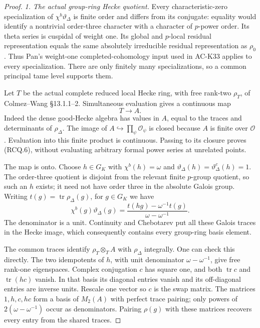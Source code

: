 \begin{proof}
\textit{1. The actual group-ring Hecke quotient.}
Every characteristic-zero specialization of
\(\chi^b\vartheta_\Delta\) is finite order and differs from its
conjugate: equality would identify a nontrivial order-three
character with a character of \(p\)-power order.
Its theta series is cuspidal of weight one.
Its global and \(p\)-local residual representation equals the same
absolutely irreducible residual representation as \(\rho_0\).
Thus Pan's weight-one completed-cohomology input used in AC-K33
applies to every specialization. There are only finitely many
specializations, so a common principal tame level supports them.

Let \(T\) be the actual complete reduced local Hecke ring, with
free rank-two \(\rho_T\), of Colmez--Wang \S13.1.1--2.
Simultaneous evaluation gives a continuous map
\[
                         T\longrightarrow A.
 \tag{RCQ.6}
\]
Indeed the dense good-Hecke algebra has values in \(A\), equal to
the traces and determinants of \(\rho_\Delta\).
The image of \(A\hookrightarrow\prod_\psi\mathcal O_\psi\) is closed
because \(A\) is finite over \(\mathcal O\). Evaluation into this
finite product is continuous. Passing to its closure proves (RCQ.6),
without evaluating arbitrary formal power series at unrelated points.

The map is onto. Choose \(h\in G_K\) with
\(\chi^b(h)=\omega\) and
\(\vartheta_\Delta(h)=\vartheta_\Delta^c(h)=1\).
The order-three quotient is disjoint from the relevant finite
\(p\)-group quotient, so such an \(h\) exists; it need not have
order three in the absolute Galois group.
Writing \(t(g)=\operatorname{tr}\rho_\Delta(g)\), for \(g\in G_K\) we have
\[
 \chi^b(g)\vartheta_\Delta(g)=
       \frac{t(hg)-\omega^{-1}t(g)}{\omega-\omega^{-1}}.
 \tag{RCQ.7}
\]
The denominator is a unit. Continuity and Chebotarev put all these
Galois traces in the Hecke image, which consequently contains every
group-ring basis element.

The common traces identify \(\rho_T\otimes_T A\) with
\(\rho_\Delta\) integrally. One can check this directly.
The two idempotents of \(h\), with unit denominator
\(\omega-\omega^{-1}\), give free rank-one eigenspaces.
Complex conjugation \(c\) has square one, and both
\(\operatorname{tr}c\) and \(\operatorname{tr}(hc)\) vanish.
In that basis its diagonal entries vanish and its off-diagonal
entries are inverse units. Rescale one vector so \(c\) is the swap
matrix. The matrices \(1,h,c,hc\) form a basis of \(M_2(A)\) with
perfect trace pairing; only powers of \(2(\omega-\omega^{-1})\)
occur as denominators. Pairing \(\rho(g)\) with these matrices
recovers every entry from the shared traces.


\end{proof}
